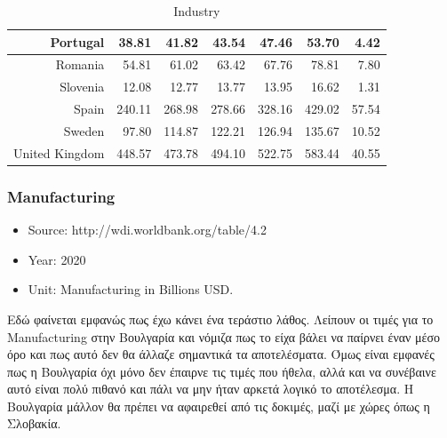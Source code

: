 \documentclass[a4paper,twoside,10pt]{article}
\begin{document}
\begin{table}[H]
\begin{tabular}{|r|rrrrr|r|}
Portugal & 38.81 & 41.82 & 43.54 & 47.46 & 53.70 & 4.42 \\ \hline
Romania & 54.81 & 61.02 & 63.42 & 67.76 & 78.81 & 7.80 \\ 
Slovenia & 12.08 & 12.77 & 13.77 & 13.95 & 16.62 & 1.31 \\ 
Spain & 240.11 & 268.98 & 278.66 & 328.16 & 429.02 & 57.54 \\ 
Sweden & 97.80 & 114.87 & 122.21 & 126.94 & 135.67 & 10.52 \\ 
United Kingdom & 448.57 & 473.78 & 494.10 & 522.75 & 583.44 & 40.55 \\ 
\hline
\end{tabular}
\caption{Industry}
\label{Industry}
\end{table}

\subsubsection{Manufacturing}
	\begin{itemize}
	\item Source: http://wdi.worldbank.org/table/4.2
	\item Year:  2020
	\item Unit:  Manufacturing in Billions USD.
\end{itemize} 

Εδώ φαίνεται εμφανώς πως έχω κάνει ένα τεράστιο λάθος. Λείπουν οι τιμές για το Manufacturing στην Βουλγαρία και νόμιζα πως το είχα βάλει να παίρνει έναν μέσο όρο και πως αυτό δεν θα άλλαζε σημαντικά τα αποτελέσματα. Όμως είναι εμφανές πως η Βουλγαρία όχι μόνο δεν έπαιρνε τις τιμές που ήθελα, αλλά και να συνέβαινε αυτό είναι πολύ πιθανό και πάλι να μην ήταν αρκετά λογικό το αποτέλεσμα. Η Βουλγαρία μάλλον θα πρέπει να αφαιρεθεί από τις δοκιμές, μαζί με χώρες όπως η Σλοβακία. 
\end{document}
